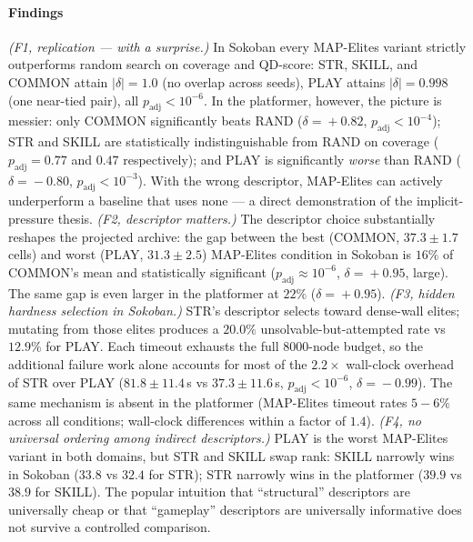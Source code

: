 \documentclass[conference]{IEEEtran}
\begin{document}
\paragraph{Findings}
\emph{(F1, replication --- with a surprise.)} In Sokoban every
MAP-Elites variant strictly outperforms random search on coverage
and QD-score: \textsf{STR}, \textsf{SKILL}, and \textsf{COMMON}
attain $|\delta|=1.0$ (no overlap across seeds), \textsf{PLAY}
attains $|\delta|=0.998$ (one near-tied pair), all
$p_\text{adj}\!<\!10^{-6}$.
In the platformer, however, the picture is messier: only
\textsf{COMMON} significantly beats \textsf{RAND} ($\delta\!=\!+0.82$,
$p_\text{adj}\!<\!10^{-4}$); \textsf{STR} and \textsf{SKILL} are
statistically indistinguishable from \textsf{RAND} on coverage
($p_\text{adj}\!=\!0.77$ and $0.47$ respectively); and
\textsf{PLAY} is significantly \emph{worse} than \textsf{RAND}
($\delta\!=\!-0.80$, $p_\text{adj}\!<\!10^{-3}$). With the wrong descriptor, MAP-Elites
can actively underperform a baseline that uses none --- a direct
demonstration of the implicit-pressure thesis.
\emph{(F2, descriptor matters.)} The descriptor choice substantially
reshapes the projected archive: the gap between the best
(\textsf{COMMON}, $37.3\!\pm\!1.7$ cells) and worst (\textsf{PLAY},
$31.3\!\pm\!2.5$) MAP-Elites condition in Sokoban is $16\%$ of
\textsf{COMMON}'s mean and statistically significant
($p_\text{adj}\!\approx\!10^{-6}$, $\delta\!=\!+0.95$, large).
The same gap is even larger in the platformer at $22\%$
($\delta\!=\!+0.95$).
\emph{(F3, hidden hardness selection in Sokoban.)} \textsf{STR}'s
descriptor selects toward dense-wall elites; mutating from those
elites produces a $20.0\%$ unsolvable-but-attempted rate vs $12.9\%$
for \textsf{PLAY}. Each timeout exhausts the full $8000$-node
budget, so the additional failure work alone accounts for most of
the $2.2\times$ wall-clock overhead of \textsf{STR} over
\textsf{PLAY} ($81.8\!\pm\!11.4$\,s vs $37.3\!\pm\!11.6$\,s,
$p_\text{adj}\!<\!10^{-6}$, $\delta\!=\!-0.99$). The same mechanism
is absent in the platformer (MAP-Elites timeout rates $5{-}6\%$
across all conditions; wall-clock differences within a factor of
$1.4$).
\emph{(F4, no universal ordering among indirect descriptors.)}
\textsf{PLAY} is the worst MAP-Elites variant in both domains, but
\textsf{STR} and \textsf{SKILL} swap rank: \textsf{SKILL} narrowly
wins in Sokoban ($33.8$ vs $32.4$ for \textsf{STR}); \textsf{STR}
narrowly wins in the platformer ($39.9$ vs $38.9$ for
\textsf{SKILL}). The popular intuition that ``structural''
descriptors are universally cheap or that ``gameplay'' descriptors
are universally informative does not survive a controlled
comparison.
\end{document}
